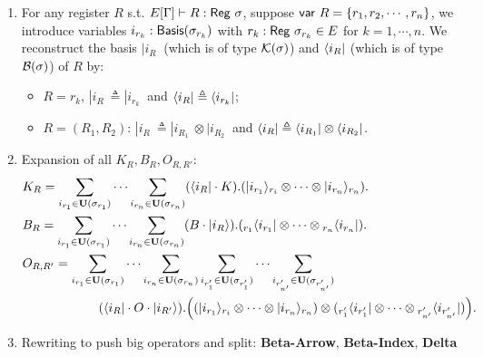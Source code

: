 \begin{enumerate}
  \item For any register $R$ s.t. $E[\Gamma]\vdash R : \mathsf{Reg}\  \sigma$, suppose $\mathsf{var}\  R = \{r_1,r_2,\cdots,r_n\}$, 
  we introduce variables $i_{r_k} : \mathsf{Basis}(\sigma_{r_k})$ with $r_k : \mathsf{Reg}\  \sigma_{r_k} \in E$ for $k = 1,\cdots, n$. We reconstruct the basis $|i_R\>$ (which is of type $\mathcal{K}(\sigma)$) and $\langle i_R|$ (which is of type $\mathcal{B}(\sigma)$) of $R$ by:
  \begin{itemize}
    \item $R = r_k$, $|i_R\> \triangleq |i_{r_k}\>$ and $\langle i_R| \triangleq \langle i_{r_k}|$;
    \item $R = (R_1,R_2)$: $|i_R\> \triangleq |i_{R_1}\> \otimes |i_{R_2}\>$ and $\langle i_R| \triangleq \langle i_{R_1}| \otimes \langle i_{R_2}|$.
  \end{itemize}
    \item Expansion of all $K_R,B_R,O_{R,R'}$:
    \begin{align*}
      &K_R = \sum_{i_{r_1}\in\mathbf{U}(\sigma_{r_1})}\cdots \sum_{i_{r_n}\in\mathbf{U}(\sigma_{r_n})} (\langle i_R|\cdot K). (|i_{r_1}\rangle_{r_i}\otimes\cdots\otimes|i_{r_n}\rangle_{r_n}).\\
      &B_R = \sum_{i_{r_1}\in\mathbf{U}(\sigma_{r_1})}\cdots \sum_{i_{r_n}\in\mathbf{U}(\sigma_{r_n})} (B\cdot |i_R\rangle). ({}_{r_1}\langle i_{r_1}|\otimes\cdots\otimes{}_{r_n}\langle i_{r_n}|).\\
      &O_{R,R'} = \sum_{i_{r_1}\in\mathbf{U}(\sigma_{r_1})}\cdots \sum_{i_{r_n}\in\mathbf{U}(\sigma_{r_n})}
      \sum_{i_{r'_1}\in\mathbf{U}(\sigma_{r'_1})}\cdots \sum_{i_{r'_{n'}}\in\mathbf{U}(\sigma_{r'_{n'}})} \\
      &\qquad\qquad\qquad (\langle i_R|\cdot O\cdot |i_{R'}\rangle).\Big((|i_{r_1}\rangle_{r_i}\otimes\cdots\otimes|i_{r_n}\rangle_{r_n})\otimes({}_{r'_1}\langle i_{r'_1}|\otimes\cdots\otimes{}_{r'_{n'}}\langle i_{r'_{n'}}|)\Big).\\
    \end{align*}
    \item Rewriting to push big operators and split: \textbf{Beta-Arrow}, \textbf{Beta-Index}, \textbf{Delta}


\end{enumerate}
